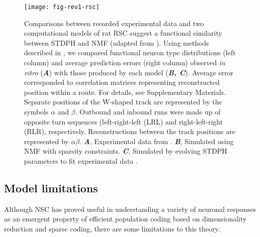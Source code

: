 \begin{figure}[h]
	\centering
	\texttt{[image: fig-rev1-rsc]}
    \caption{
    	Comparisons between recorded experimental data and two 
        computational models of rat \ac{RSC} suggest a functional 
        similarity between \ac{STDPH} and \ac{NMF} 
        (adapted from \cite{Rounds2018}). 
        Using methods described in \cite{AlexanderNitz2015}, 
        we compared functional neuron type distributions (left column)
        and average prediction errors (right column)
        observed \emph{in vitro} (\textbf{\emph{A}}) with those
        produced by each model (\textbf{\emph{B, C}}).
        Average error corresponded to correlation matrices 
        representing reconstructed position within a route. 
        For details, see Supplementary Materials.
        Separate positions of the W-shaped track are represented 
        by the symbols $\alpha$ and $\beta$. 
        Outbound and inbound runs were made up of 
        opposite turn sequences (left-right-left (LRL) 
        and right-left-right (RLR), respectively.
        Reconstructions between the track positions are represented by
        $\alpha \beta$.
	    \textbf{\emph{A}},
    		Experimental data from \cite{AlexanderNitz2015}.
        \textbf{\emph{B}},
            Simulated using NMF with sparsity constraints.
        \textbf{\emph{C}},
            Simulated by evolving \ac{STDPH} parameters 
            to fit experimental data \cite{BeyelerCarlsonChou2015,Carlson2014}.
    }
	\label{fig:NMF|RSC}
\end{figure} 


\subsection*{Model limitations}

Although \ac{NSC} has proved useful in understanding
a variety of neuronal responses
as an emergent property of efficient population
coding based on dimensionality reduction and sparse coding,
there are some limitations to this theory.

